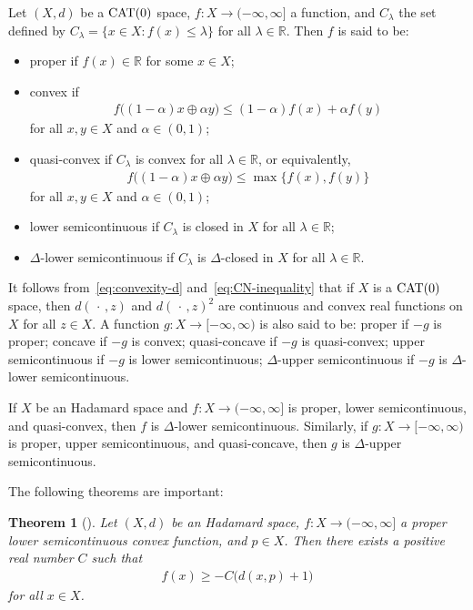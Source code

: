 \documentclass[draft]{amsart}
\numberwithin{equation}{section}
\def\R{\mathbb R}
\newcommand{\CAT}{\textup{CAT}}
\theoremstyle{plain}
\newtheorem{theorem}{Theorem}[section]
\theoremstyle{definition}
\theoremstyle{remark}
\begin{document}
Let $(X,d)$ be a $\CAT(0)$ space, 
$f\colon X\to (-\infty, \infty]$ a function, and 
$C_{\lambda}$ the set defined by 
$C_{\lambda}=\{x\in X: f(x)\leq \lambda\}$ 
for all $\lambda\in \R$. Then $f$ is said to be: 
\begin{itemize}
 \item proper if $f(x)\in \R$ for some $x\in X$; 
 \item convex if 
 \begin{align}
 f\bigl((1-\alpha)x\oplus \alpha y\bigr) 
 \leq (1-\alpha)f(x) + \alpha f(y) 
 \end{align}
 for all $x,y\in X$ and $\alpha \in (0,1)$; 
 \item quasi-convex if $C_{\lambda}$ is convex 
for all $\lambda \in \R$, or equivalently,  
\begin{align}
 f\bigl((1-\alpha)x\oplus \alpha y\bigr) 
 \leq \max\{f(x), f(y)\}
\end{align}
 for all $x,y\in X$ and $\alpha \in (0,1)$; 
 \item lower semicontinuous if $C_{\lambda}$ 
 is closed in $X$ for all $\lambda \in \R$; 
 \item $\Delta$-lower semicontinuous if 
 $C_{\lambda}$ is $\Delta$-closed in $X$ for all $\lambda \in \R$. 
\end{itemize}
It follows from~\eqref{eq:convexity-d} 
and~\eqref{eq:CN-inequality} that 
if $X$ is a $\CAT(0)$ space, then 
$d(\,\cdot\,,z)$ and $d(\,\cdot\,, z)^2$ 
are continuous and convex real functions on $X$ for all $z\in X$. 
A function $g\colon X\to [-\infty, \infty)$ is also said to be: 
proper if $-g$ is proper; concave if $-g$ is convex; 
quasi-concave if $-g$ is quasi-convex; 
upper semicontinuous if $-g$ is lower semicontinuous; 
$\Delta$-upper semicontinuous if 
 $-g$ is $\Delta$-lower semicontinuous. 

If $X$ be an Hadamard space 
and $f\colon X\to (-\infty, \infty]$ is 
 proper, lower semicontinuous, and quasi-convex, 
 then $f$ is $\Delta$-lower semicontinuous. 
Similarly, if $g\colon X\to [-\infty, \infty)$ is 
 proper, upper semicontinuous, and quasi-concave, 
 then $g$ is $\Delta$-upper semicontinuous. 

The following theorems are important: 

\begin{theorem}[{\cite[Lemma~2.2.13]{MR3241330}}]\label{thm:Bacak-umbrella}
 Let $(X,d)$ be an Hadamard space, 
 $f\colon X\to (-\infty, \infty]$ a proper lower semicontinuous 
 convex function, and $p\in X$. Then 
 there exists a positive real number $C$ such that 
 \begin{align}
  f(x) \geq -C \bigl(d(x, p) + 1\bigr)
 \end{align}
 for all $x\in X$. 
\end{theorem}
\end{document}
